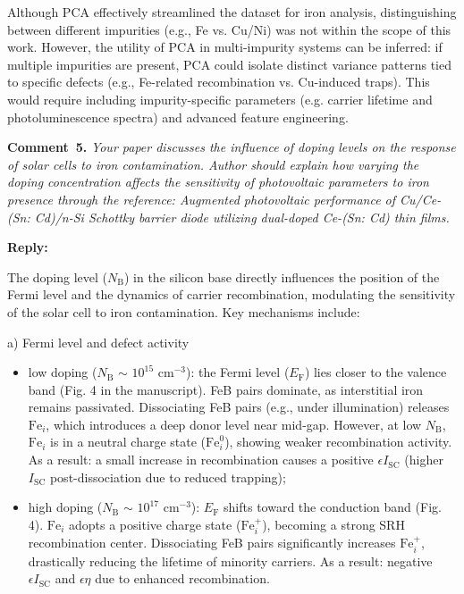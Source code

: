 \documentclass[a4paper,fleqn]{cas-sc}
\begin{document}
Although PCA effectively streamlined the dataset for iron analysis, distinguishing between different impurities (e.g., Fe vs. Cu/Ni) was not within the scope of this work. However, the utility of PCA in multi-impurity systems can be inferred: if multiple impurities are present, PCA could isolate distinct variance patterns tied to specific defects (e.g., Fe-related recombination vs. Cu-induced traps). This would require including impurity-specific parameters (e.g. carrier lifetime and photoluminescence spectra) and advanced feature engineering.


\vspace{1cm}
\noindent
\textcolor[rgb]{0.00,0.50,1.00}{\textbf{Comment~5.}}
\emph{Your paper discusses the influence of doping levels on the response of solar cells to iron contamination. Author should explain how varying the doping concentration affects the sensitivity of photovoltaic parameters to iron presence through the reference:
Augmented photovoltaic performance of Cu/Ce-(Sn: Cd)/n-Si Schottky barrier diode utilizing dual-doped Ce-(Sn: Cd) thin films.}

\noindent
\textcolor[rgb]{0.51,0.00,0.00}{\textbf{Reply:}}

The doping level ($N_\mathrm{B}$) in the silicon base directly influences the position of the Fermi level and the dynamics of carrier recombination, modulating the sensitivity of the solar cell to iron contamination. Key mechanisms include:

a) Fermi level and defect activity

\begin{itemize}
    \item low doping ($N_\mathrm{B}$ $\sim$ $10^{15}$ cm$^{-3}$): the Fermi level ($E_\mathrm{F}$) lies closer to the valence band (Fig. 4 in the manuscript). FeB pairs dominate, as interstitial iron remains passivated. Dissociating FeB pairs (e.g., under illumination) releases $\mathrm{Fe}_i$, which introduces a deep donor level near mid-gap. However, at low $N_\mathrm{B}$,  $\mathrm{Fe}_i$ is in a neutral charge state ($\mathrm{Fe}_i^0$), showing weaker recombination activity. As a result: a small increase in recombination causes a positive  $\epsilon I_\mathrm{SC}$ (higher $I_\mathrm{SC}$ post-dissociation due to reduced trapping);
    \item high doping ($N_\mathrm{B}$ $\sim$ $10^{17}$ cm$^{-3}$): $E_\mathrm{F}$ shifts toward the conduction band (Fig. 4). $\mathrm{Fe}_i$ adopts a positive charge state ($\mathrm{Fe}_i^+$), becoming a strong SRH recombination center. Dissociating FeB pairs significantly increases $\mathrm{Fe}_i^+$, drastically reducing the lifetime of minority carriers. As a result: negative $\epsilon I_\mathrm{SC}$ and $\epsilon \eta$ due to enhanced recombination.
\end{itemize}
\end{document}
